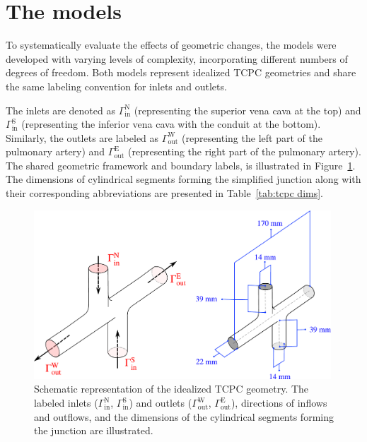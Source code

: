 \section{The models}

To systematically evaluate the effects of geometric changes, the models were developed with varying levels of complexity, incorporating different numbers of degrees of freedom. Both models represent idealized TCPC geometries and share the same labeling convention for inlets and outlets. 

The inlets are denoted as $\Gamma^{\text{N}}_{\text{in}}$ (representing the superior vena cava at the top) and $\Gamma^{\text{S}}_{\text{in}}$ (representing the inferior vena cava with the conduit at the bottom). Similarly, the outlets are labeled as $\Gamma^{\text{W}}_{\text{out}}$ (representing the left part of the pulmonary artery) and $\Gamma^{\text{E}}_{\text{out}}$ (representing the right part of the pulmonary artery).
The shared geometric framework and boundary labels, is illustrated in Figure~\ref{fig:junction schema}. The dimensions of cylindrical segments forming the simplified junction along with their corresponding abbreviations are presented in Table~\ref{tab:tcpc dims}.


\begin{figure}[H]
	\centering
	\vspace{2mm}
	\includegraphics[width=0.99\textwidth]{figures/3d-tcpc-schema-combined.pdf}
	\vspace{7mm}
	\caption{Schematic representation of the idealized TCPC geometry. The labeled inlets ($\Gamma^{\text{N}}_{\text{in}}$, $\Gamma^{\text{S}}_{\text{in}}$) and outlets ($\Gamma^{\text{W}}_{\text{out}}$, $\Gamma^{\text{E}}_{\text{out}}$), directions of inflows and outflows, and the dimensions of the cylindrical segments forming the junction are illustrated.}
	\label{fig:junction schema}
\end{figure}

